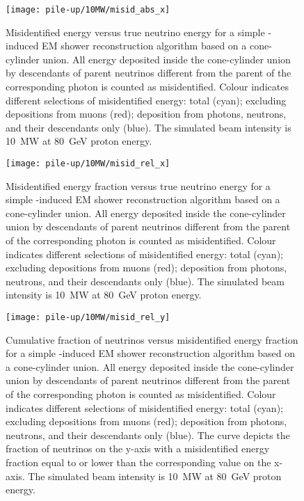 \begin{figure}[htb]
	\centering
	\texttt{[image: pile-up/10MW/misid\_abs\_x]}
	\caption{Misidentified energy versus true neutrino energy for a simple \Pgpz-induced EM shower reconstruction algorithm based on a cone-cylinder union.
		All energy deposited inside the cone-cylinder union by descendants of parent neutrinos different from the parent of the corresponding \Pgpz photon is counted as misidentified.
		Colour indicates different selections of misidentified energy: total (cyan); excluding depositions from muons (red); deposition from photons, neutrons, and their descendants only (blue).
		The simulated beam intensity is \SI{10}{\mega\watt} at \SI{80}{\giga\electronvolt} proton energy.}
	\label{fig:dune-nd_10MW_misid-abs-x}
\end{figure}

\begin{figure}[htb]
	\centering
	\texttt{[image: pile-up/10MW/misid\_rel\_x]}
	\caption{Misidentified energy fraction versus true neutrino energy for a simple \Pgpz-induced EM shower reconstruction algorithm based on a cone-cylinder union.
		All energy deposited inside the cone-cylinder union by descendants of parent neutrinos different from the parent of the corresponding \Pgpz photon is counted as misidentified.
		Colour indicates different selections of misidentified energy: total (cyan); excluding depositions from muons (red); deposition from photons, neutrons, and their descendants only (blue).
		The simulated beam intensity is \SI{10}{\mega\watt} at \SI{80}{\giga\electronvolt} proton energy.}
	\label{fig:dune-nd_10MW_misid-rel-x}
\end{figure}

\begin{figure}[htb]
	\centering
	\texttt{[image: pile-up/10MW/misid\_rel\_y]}
	\caption{Cumulative fraction of neutrinos versus misidentified energy fraction for a simple \Pgpz-induced EM shower reconstruction algorithm based on a cone-cylinder union.
		All energy deposited inside the cone-cylinder union by descendants of parent neutrinos different from the parent of the corresponding \Pgpz photon is counted as misidentified.
		Colour indicates different selections of misidentified energy: total (cyan); excluding depositions from muons (red); deposition from photons, neutrons, and their descendants only (blue).
		The curve depicts the fraction of neutrinos on the y-axis with a misidentified energy fraction equal to or lower than the corresponding value on the x-axis.
		The simulated beam intensity is \SI{10}{\mega\watt} at \SI{80}{\giga\electronvolt} proton energy.}
	\label{fig:dune-nd_10MW_misid-rel-y}
\end{figure}

